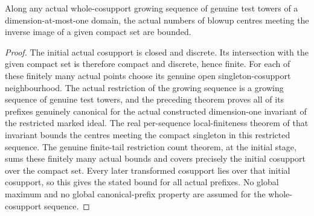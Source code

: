 \begin{theorem}
\label{hir:curve-whole-cosupport-compact-count-bound}
\leanok
Along any actual whole-cosupport growing sequence of genuine test towers of
a dimension-at-most-one domain, the actual numbers of blowup centres meeting
the inverse image of a given compact set are bounded.
\end{theorem}
\begin{proof}
The initial actual cosupport is closed and discrete. Its intersection with
the given compact set is therefore compact and discrete, hence finite.
For each of these finitely many actual points choose its genuine open
singleton-cosupport neighbourhood. The actual restriction of the growing
sequence is a growing sequence of genuine test towers, and the preceding
theorem proves all of its prefixes genuinely canonical for the actual
constructed dimension-one invariant of the restricted marked ideal.
The real per-sequence local-finiteness theorem of that invariant bounds
the centres meeting the compact singleton in this restricted sequence.
The genuine finite-tail restriction count theorem, at the initial stage,
sums these finitely many actual bounds and covers precisely the initial
cosupport over the compact set. Every later transformed cosupport lies
over that initial cosupport, so this gives the stated bound for all actual
prefixes. No global maximum and no global canonical-prefix property are
assumed for the whole-cosupport sequence.
\end{proof}

